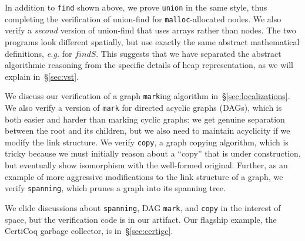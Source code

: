 \documentclass[acmsmall,screen]{acmart}
\newcommand{\li}[1]{{\texttt{\small #1}}}
\newcommand\hide[1]{}
\newcommand{\p}[1]{\ensuremath{\mathsf{#1}}} \newcommand{\m}[1]{\ensuremath{\mathit{#1}}} \newcommand{\ma}[1]{\ensuremath{\mathcal{#1}}} \let\ramify\lightning
\newcommand{\infrulestyle}[1]{\textsc{#1}}
\begin{document}
In addition to \li{find} shown above, we prove \li{union}
in the same style, thus completing the verification of 
union-find for \li{malloc}-allocated nodes.
We also verify a \emph{second} version of union-find that uses
arrays rather than nodes. The two programs look different spatially, but 
use exactly the same abstract mathematical definitions,
\emph{e.g.} for $\m{findS}$. 
This suggests that we have separated the abstract algorithmic 
reasoning from the specific details of heap representation, as we will explain
in~\S\ref{sec:vst}.

We discuss our verification of a graph \li{mark}ing algorithm 
in~\S\ref{sec:localizations}. We also verify a version of \li{mark} 
for directed acyclic graphs (DAGs), which is both easier and harder than 
marking cyclic graphs: we get genuine separation
between the root and its children, but we also need to maintain acyclicity if
we modify the link structure.
We verify \li{copy}, a graph copying algorithm, which is tricky because
we must initially reason about a ``copy'' that is under construction, 
but eventually show isomorphism with the well-formed original.
Further, as an example of more aggressive modifications to the link structure 
of a graph, we verify \li{spanning}, which prunes a graph into its 
spanning tree. 

We elide discussions about \li{spanning}, DAG \li{mark}, and \li{copy} 
in the interest of space, but the verification code is in our artifact.
Our flagship example, the CertiCoq garbage collector, is in~\S\ref{sec:certigc}.

\hide{
(Assume until~\S\ref{sec:existentials} that $L_2$ and $G_2$ do not contain ``fancy'' existentials; in this case the explicit existentials in \textsc{Localize} can be ,
which effectively makes them trivial.)  What then remains is to choose a predicate $R$ and prove the two entailments in \textsc{Localize}.  If one ignores the side condition about modified local variables

Turning to the body of the verification (lines~\ref{code:inmark}--\ref{code:outmark}), readers may already have noticed our new notation: blocks of proof sketch bracketed

, such as lines~\ref{code:beforerootmark}--\ref{code:afterrootmark}.  We call a bracketed set of lines like this a ``localization block''; localization blocks were inspired by our new \li{localize} $\searrow$ and \li{unlocalize} $\swarrow$ tactics in Floyd (\S\ref{sec:vst}).


In lines~\ref{code:beforerootmark}--\ref{code:afterrootmark}, imagine unfolding the \p{graph} predicate in line~\ref{code:globalbeforerootmark} using equation \eqref{eqn:bigraphintrofoldunfold} and then zooming in to the root node \li{x} for lines~\ref{code:beforerootmark}--\ref{code:afterrootmark}, before zooming back out in line~\ref{code:globalafterrootmark}.

To define localization blocks formally we need to first understand the \infrulestyle{Frame} and \infrulestyle{Ramify} rules.
}
\end{document}
